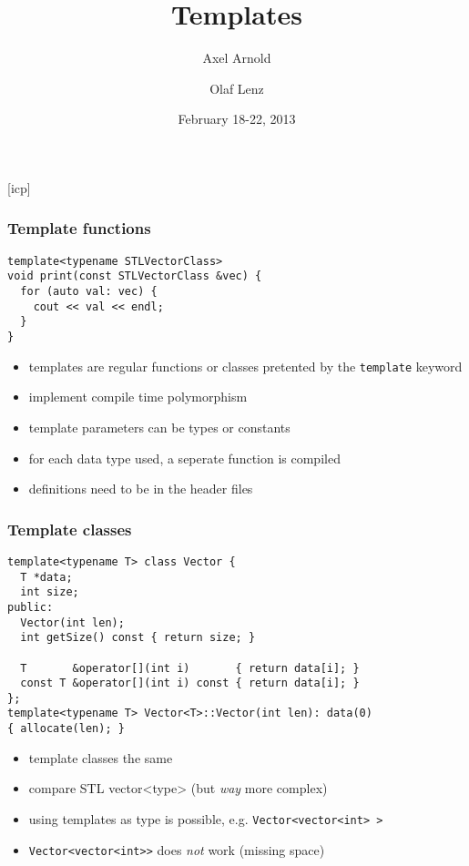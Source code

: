 \documentclass{slides}
\begin{document}
\graphicspath{{figures/}}

\title[Templates]{\Large Templates}

\author[A. Arnold and O. Lenz]{Axel Arnold \and Olaf Lenz} 
\date{February 18-22, 2013}

\begin{frame}
  \titlepage
\end {frame}
[icp]

\begin{frame}[fragile]
  \frametitle{Template functions}
\begin{lstlisting}[emph={template}]
template<typename STLVectorClass>
void print(const STLVectorClass &vec) {
  for (auto val: vec) {
    cout << val << endl;
  }
}
\end{lstlisting}

  \begin{itemize}
  \item templates are regular functions or classes pretented by the
    \lstinline!template! keyword
  \item implement compile time polymorphism
  \item template parameters can be types or constants
  \item for each data type used, a seperate function is compiled
  \item definitions need to be in the header files
  \end{itemize}
\end{frame}

\begin{frame}[fragile]
  \frametitle{Template classes}

\begin{lstlisting}[emph={template}]
template<typename T> class Vector {
  T *data;
  int size;
public:
  Vector(int len);
  int getSize() const { return size; }

  T       &operator[](int i)       { return data[i]; }
  const T &operator[](int i) const { return data[i]; }
};
template<typename T> Vector<T>::Vector(int len): data(0)
{ allocate(len); }
\end{lstlisting}

  \begin{itemize}
  \item template classes the same
  \item compare STL vector<type> (but \emph{way} more complex)
  \item using templates as type is possible, e.g.
    \lstinline!Vector<vector<int> >!
  \item \lstinline!Vector<vector<int>>! does \emph{not} work (missing space)
  \end{itemize}
\end{frame}
\end{document}
